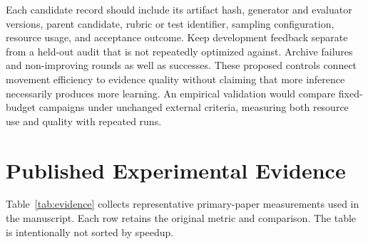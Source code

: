 \documentclass[journal]{IEEEtran}
\begin{document}
Each candidate record should include its artifact hash, generator and evaluator versions, parent candidate, rubric or test identifier, sampling configuration, resource usage, and acceptance outcome. Keep development feedback separate from a held-out audit that is not repeatedly optimized against. Archive failures and non-improving rounds as well as successes. These proposed controls connect movement efficiency to evidence quality without claiming that more inference necessarily produces more learning. An empirical validation would compare fixed-budget campaigns under unchanged external criteria, measuring both resource use and quality with repeated runs.

\section{Published Experimental Evidence}
Table~\ref{tab:evidence} collects representative primary-paper measurements used in the manuscript. Each row retains the original metric and comparison. The table is intentionally not sorted by speedup.
\end{document}
